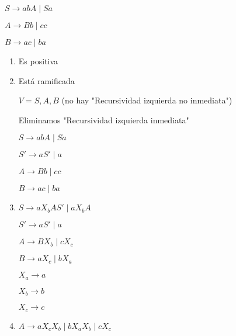 \documentclass[12pt]{article}
\begin{document}
\begin{ejemplo}

  \begin{center}
    $S \rightarrow abA \mid Sa$
  
    $A \rightarrow Bb \mid cc$
  
    $B \rightarrow ac \mid ba$
  \end{center}
  
  \begin{enumerate}
    \item Es positiva
    \item Está ramificada

    $V = {S, A, B}$ (no hay "Recursividad izquierda no inmediata")
    
    Eliminamos "Recursividad izquierda inmediata"

    $S \rightarrow abA \mid Sa$

    $S' \rightarrow aS' \mid a$

    $A \rightarrow Bb \mid cc$

    $B \rightarrow ac \mid ba$

    \item $S \rightarrow aX_bAS' \mid aX_bA$
    
    $S' \rightarrow aS' \mid a$

    $A \rightarrow BX_b \mid cX_c$

    $B \rightarrow aX_c \mid bX_a$

    $X_a \rightarrow a$

    $X_b \rightarrow b$

    $X_c \rightarrow c$

    \item $A \rightarrow aX_cX_b \mid bX_aX_b \mid cX_c$
  \end{enumerate}

\end{ejemplo}
\end{document}
